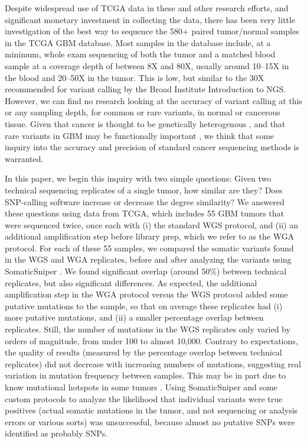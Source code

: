 \documentclass[11pt]{article} %
\begin{document}
Despite widespread use of TCGA data in these and other research efforts, and significant monetary investment in collecting the data, there has been very little investigation of the best way to sequence the 580+ paired tumor/normal samples in the TCGA GBM database. Most samples in the database include, at a minimum, whole exam sequencing of both the tumor and a matched blood sample at a coverage depth of between 8X and 80X, usually around 10--15X in the blood and 20--50X in the tumor. This is low, but similar to the 30X recommended for variant calling by the Broad Institute Introduction to NGS. However, we can find no research looking at the accuracy of variant calling at this or any sampling depth, for common or rare variants, in normal or cancerous tissue. Given that cancer is thought to be genetically heterogenous \citep{heterogenous1, heterogenous2}, and that rare variants in GBM may be functionally important \citep{rare}, we think that some inquiry into the accuracy and precision of standard cancer sequencing methods is warranted. 

In this paper, we begin this inquiry with two simple questions: Given two technical sequencing replicates of a single tumor, how similar are they? Does SNP-calling software increase or decrease the degree similarity? We answered these questions using data from TCGA, which includes 55 GBM tumors that were sequenced twice, once each with (i) the standard WGS protocol, and (ii) an additional amplification step before library prep, which we refer to as the WGA protocol. For each of these 55 samples, we compared the somatic variants found in the WGS and WGA replicates, before and after analyzing the variants using SomaticSniper \citep{SomaticSniper}. We found significant overlap (around 50\%) between technical replicates, but also significant differences. As expected, the additional amplification step in the WGA protocol versus the WGS protocol added some putative mutations to the sample, so that on average these replicates had (i) more putative mutations, and (ii) a smaller percentage overlap between replicates. Still, the number of mutations in the WGS replicates only varied by orders of magnitude, from under 100 to almost 10,000. Contrary to expectations, the quality of results (measured by the percentage overlap between technical replicates) did not decrease with increasing numbers of mutations, suggesting real variation in mutation frequency between samples. This may be in part due to know mutational hotspots in some tumors \citep{Karen}. Using SomaticSniper and some custom protocols to analyze the likelihood that individual variants were true positives (actual somatic mutations in the tumor, and not sequencing or analysis errors or various sorts) was unsuccessful, because almost no putative SNPs were identified as probably SNPs.
\end{document}
